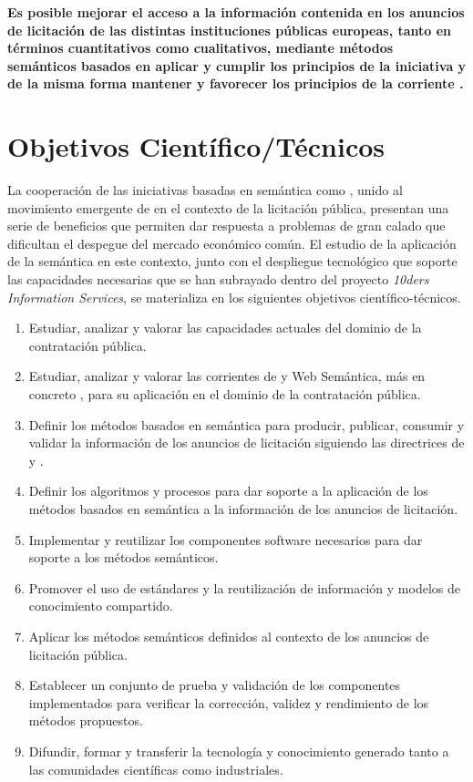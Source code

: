 \begin{Frame}
\textbf{Es posible mejorar el acceso a la información contenida en los anuncios de licitación de 
las distintas instituciones públicas europeas, tanto en términos cuantitativos como cualitativos, mediante métodos semánticos basados 
en aplicar y cumplir los principios de la iniciativa \linkeddata y de la misma forma mantener y favorecer
los principios de la corriente \opendata.}
\end{Frame}


\section{Objetivos Científico/Técnicos}\label{objetivos}
La cooperación de las iniciativas basadas en semántica como \linkeddata, unido al movimiento emergente
de \opendata en el contexto de la licitación pública, presentan una serie de beneficios que permiten
dar respuesta a problemas de gran calado que dificultan el despegue del mercado económico común. El estudio 
de la aplicación de la semántica en este contexto, junto con el despliegue tecnológico que soporte
las capacidades necesarias que se han subrayado dentro del proyecto \textit{10ders Information Services}, se
materializa en los siguientes objetivos científico-técnicos.

\begin{enumerate}
\item Estudiar, analizar y valorar las capacidades actuales del dominio de la contratación pública.  %
\item Estudiar, analizar y valorar las corrientes de \opendata y Web Semántica, más en concreto \linkeddata, para su
aplicación en el dominio de la contratación pública.%
 \item Definir los métodos basados en semántica para producir, publicar, consumir y validar 
la información de los anuncios de licitación siguiendo las directrices de \opendata y \linkeddata. %
 \item Definir los algoritmos y procesos para dar soporte a la aplicación de los métodos basados en semántica 
a la información de los anuncios de licitación. %
\item Implementar y reutilizar los componentes software necesarios para dar soporte a los métodos semánticos.%
\item Promover el uso de estándares y la reutilización de información y modelos de conocimiento compartido.%
\item Aplicar los métodos semánticos definidos al contexto de los anuncios de licitación pública.%
\item Establecer un conjunto de prueba y validación de los componentes implementados para verificar la corrección, 
 validez y rendimiento de los métodos propuestos.%
\item Difundir, formar y transferir la tecnología y conocimiento generado tanto a las comunidades científicas como industriales.%
\end{enumerate}

